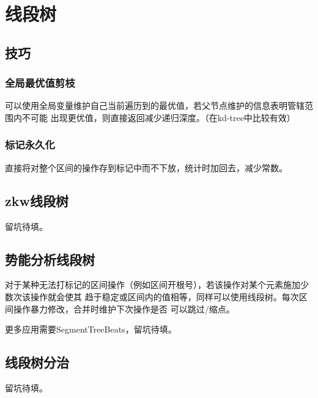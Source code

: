 \section{线段树}
\subsection{技巧}
\subsubsection{全局最优值剪枝}
可以使用全局变量维护自己当前遍历到的最优值，若父节点维护的信息表明管辖范围内不可能
出现更优值，则直接返回减少递归深度。（在kd-tree中比较有效）
\subsubsection{标记永久化}
直接将对整个区间的操作存到标记中而不下放，统计时加回去，减少常数。
\subsection{zkw线段树}
留坑待填。
\subsection{势能分析线段树}
对于某种无法打标记的区间操作（例如区间开根号），若该操作对某个元素施加少数次该操作就会使其
趋于稳定或区间内的值相等，同样可以使用线段树。每次区间操作暴力修改，合并时维护下次操作是否
可以跳过/缩点。

更多应用需要SegmentTreeBeats，留坑待填。
\subsection{线段树分治}
留坑待填。
